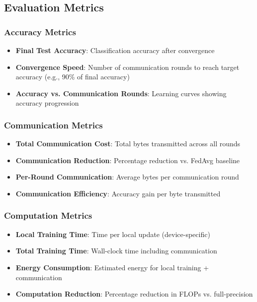 \documentclass[journal]{IEEEtran}
\begin{document}
\subsection{Evaluation Metrics}

\subsubsection{Accuracy Metrics}

\begin{itemize}
    \item \textbf{Final Test Accuracy}: Classification accuracy after convergence
    \item \textbf{Convergence Speed}: Number of communication rounds to reach target accuracy (e.g., 90\% of final accuracy)
    \item \textbf{Accuracy vs. Communication Rounds}: Learning curves showing accuracy progression
\end{itemize}

\subsubsection{Communication Metrics}

\begin{itemize}
    \item \textbf{Total Communication Cost}: Total bytes transmitted across all rounds
    \item \textbf{Communication Reduction}: Percentage reduction vs. FedAvg baseline
    \item \textbf{Per-Round Communication}: Average bytes per communication round
    \item \textbf{Communication Efficiency}: Accuracy gain per byte transmitted
\end{itemize}

\subsubsection{Computation Metrics}

\begin{itemize}
    \item \textbf{Local Training Time}: Time per local update (device-specific)
    \item \textbf{Total Training Time}: Wall-clock time including communication
    \item \textbf{Energy Consumption}: Estimated energy for local training + communication
    \item \textbf{Computation Reduction}: Percentage reduction in FLOPs vs. full-precision
\end{itemize}
\end{document}
